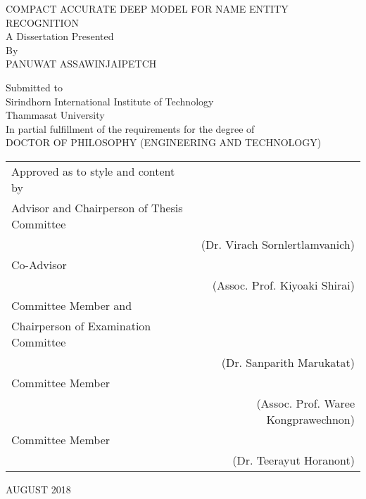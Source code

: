 
\setlength{\parindent}{4em}
\setlength{\parskip}{1em}
\renewcommand{\baselinestretch}{2.0} 
\begin{center}
        \large{COMPACT ACCURATE DEEP MODEL FOR NAME ENTITY RECOGNITION}\\


        \normalsize{A Dissertation Presented}\\      
        By \\  
        PANUWAT ASSAWINJAIPETCH
        
        \normalsize{Submitted to\\
Sirindhorn International Institute of Technology\\
Thammasat University \\ 
In partial fulfillment of the requirements for the degree of\\
DOCTOR OF PHILOSOPHY (ENGINEERING AND TECHNOLOGY)
}


 \vfill{} 
 \begin{table}[hb!]
\begin{tabular}{lr}
 Approved as to style and content by &  \\[7pt]
 
 Advisor and Chairperson of Thesis Committee  & \underline{\hspace{6cm}} \\[7pt]
 &  (Dr. Virach Sornlertlamvanich) \\
 
Co-Advisor  &  \underline{\hspace{6cm}}  \\[7pt]
 &  (Assoc. Prof. Kiyoaki Shirai) \\
 
 
 
Committee Member and  & \\[7pt]
Chairperson of Examination Committee  & \underline{\hspace{6cm}}  \\
  &  (Dr. Sanparith Marukatat) \\
  
  
Committee Member  &  \underline{\hspace{6cm}}  \\[7pt]
 &  (Assoc. Prof. Waree Kongprawechnon) \\
 
 
Committee Member  &  \underline{\hspace{6cm}}  \\[7pt]
 &  (Dr. Teerayut Horanont) \\

\end{tabular}
\end{table}

AUGUST 2018
\end{center}